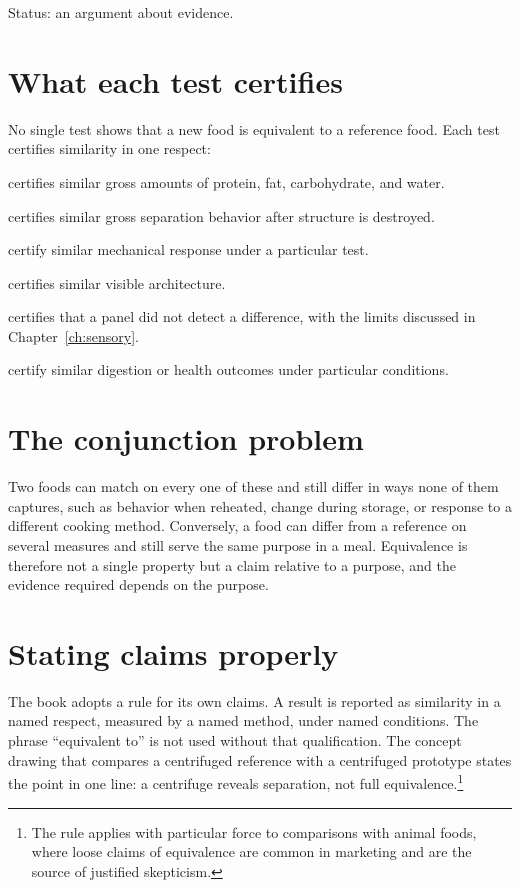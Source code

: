 \documentclass[11pt,openany]{book}
\theoremstyle{definition}
\begin{document}
Status: an argument about evidence.

\section{What each test certifies}

No single test shows that a new food is equivalent to a reference food. Each test certifies similarity in one respect:

\begin{description}[leftmargin=1.5em]
\item[Proximate composition] certifies similar gross amounts of protein, fat, carbohydrate, and water.
\item[Centrifugal profile] certifies similar gross separation behavior after structure is destroyed.
\item[Texture profile analysis and shear force] certify similar mechanical response under a particular test.
\item[Cross-section imaging] certifies similar visible architecture.
\item[Triangle testing] certifies that a panel did not detect a difference, with the limits discussed in Chapter~\ref{ch:sensory}.
\item[Nutritional studies] certify similar digestion or health outcomes under particular conditions.
\end{description}

\section{The conjunction problem}

Two foods can match on every one of these and still differ in ways none of them captures, such as behavior when reheated, change during storage, or response to a different cooking method. Conversely, a food can differ from a reference on several measures and still serve the same purpose in a meal. Equivalence is therefore not a single property but a claim relative to a purpose, and the evidence required depends on the purpose.

\section{Stating claims properly}

The book adopts a rule for its own claims. A result is reported as similarity in a named respect, measured by a named method, under named conditions. The phrase ``equivalent to'' is not used without that qualification. The concept drawing that compares a centrifuged reference with a centrifuged prototype states the point in one line: a centrifuge reveals separation, not full equivalence.\footnote{The rule applies with particular force to comparisons with animal foods, where loose claims of equivalence are common in marketing and are the source of justified skepticism.}
\end{document}
